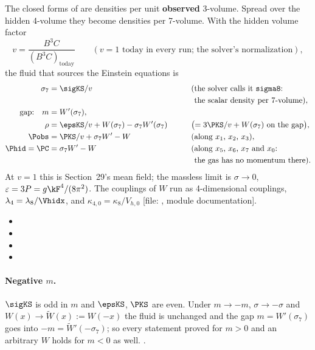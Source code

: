 The closed forms of  are densities per unit \textbf{observed} 3-volume. Spread over the
hidden 4-volume they become densities per 7-volume. With the hidden volume factor
\[
  v=\frac{B^3C}{(B^3C)_{\mathrm{today}}}\qquad(v=1\text{ today in every run; the solver's normalization}),
\]
the fluid that sources the Einstein equations is 
\begin{alignat*}{2}
  \sigma_7&=\sigKS/v &\qquad&\text{(the solver calls it \texttt{sigma8}:}\\
  & &&\text{\phantom{(}the scalar density per 7-volume)},\\
  \text{gap:}\quad m&=W'(\sigma_7),\\
  \rho&=\epsKS/v+W(\sigma_7)-\sigma_7W'(\sigma_7) &&\bigl(=3\PKS/v+W(\sigma_7)\text{ on the gap}\bigr),\\
  \Pobs&=\PKS/v+\sigma_7W'-W &&\text{(along $x_1$, $x_2$, $x_3$)},\\
  \Phid=\PC&=\sigma_7W'-W &&\text{(along $x_5$, $x_6$, $x_7$ and $x_0$:}\\
  & &&\text{\phantom{(}the gas has no momentum there)}.
\end{alignat*}
At $v=1$ this is Section~29's mean field; the massless limit is $\sigma\to0$,
$\varepsilon=3P=g\kF^4/(8\pi^2)$. The couplings of $W$ run as 4-dimensional couplings,
$\lambda_4=\lambda_8/\Vhidx$, and $\kappa_{4,0}=\kappa_8/V_{h,0}$ [file: , module
documentation]. 
\begin{itemize}
  \item {}
  \item {}
  \item {}
  \item {}
\end{itemize}

\paragraph{Negative $m$.} $\sigKS$ is odd in $m$ and $\epsKS$, $\PKS$ are even. Under $m\to-m$,
$\sigma\to-\sigma$ and $W(x)\to\tilde W(x):=W(-x)$ the fluid is unchanged and the gap $m=W'(\sigma_7)$ goes
into $-m=\tilde W'(-\sigma_7)$; so every statement proved for $m>0$ and an arbitrary $W$ holds for $m<0$ as
well.  .

